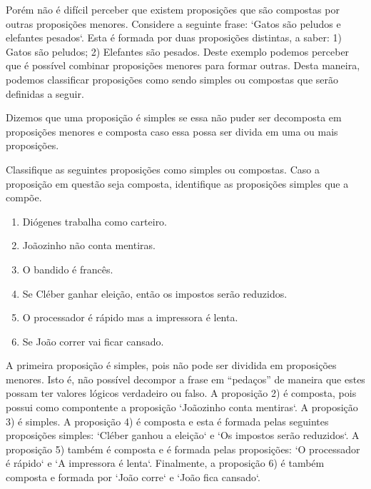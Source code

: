 Por\'em n\~ao \'e dif\'icil perceber que existem proposi\c{c}\~oes que s\~ao compostas por outras proposi\c{c}\~oes menores. Considere a
seguinte frase: `Gatos s\~ao peludos e elefantes pesados`. Esta \'e formada por duas proposi\c{c}\~oes distintas, a saber: 1) Gatos s\~ao peludos; 
2) Elefantes s\~ao pesados. Deste exemplo podemos perceber que \'e poss\'ivel combinar proposi\c{c}\~oes menores para formar outras. Desta maneira,
podemos classificar proposi\c{c}\~oes como sendo simples ou compostas que ser\~ao definidas a seguir.

\begin{Definition}
   Dizemos que uma proposi\c{c}\~ao \'e simples se essa n\~ao puder ser decomposta em proposi\c{c}\~oes menores e composta caso
   essa possa ser divida em uma ou mais proposi\c{c}\~oes. 
\end{Definition}
\begin{Example}
  Classifique as seguintes proposi\c{c}\~oes como simples ou compostas. Caso a proposi\c{c}\~ao em quest\~ao seja composta, identifique
  as proposi\c{c}\~oes simples que a comp\~oe.
  \begin{enumerate}
    \item Di\'ogenes trabalha como carteiro.
    \item Jo\~aozinho n\~ao conta mentiras.
    \item O bandido \'e franc\^es.
    \item Se Cl\'eber ganhar elei\c{c}\~ao, ent\~ao os impostos ser\~ao reduzidos.
    \item O processador \'e r\'apido mas a impressora \'e lenta.
    \item Se Jo\~ao correr vai ficar cansado.
  \end{enumerate}
  A primeira proposi\c{c}\~ao \'e simples, pois n\~ao pode ser dividida em proposi\c{c}\~oes menores. Isto \'e, n\~ao poss\'ivel decompor a frase
  em ``peda\c{c}os'' de maneira que estes possam ter valores l\'ogicos verdadeiro ou falso. A proposi\c{c}\~ao 2) \'e composta, pois possui como
  compontente a proposi\c{c}\~ao `Jo\~aozinho conta mentiras`. A proposi\c{c}\~ao 3) \'e simples. A proposi\c{c}\~ao 4) \'e composta e esta \'e 
  formada pelas seguintes proposi\c{c}\~oes simples: `Cl\'eber ganhou a elei\c{c}\~ao` e `Os impostos ser\~ao reduzidos`. A proposi\c{c}\~ao 5)
  tamb\'em \'e composta e \'e formada pelas proposi\c{c}\~oes: `O processador \'e r\'apido` e `A impressora \'e lenta`. Finalmente, a 
  proposi\c{c}\~ao 6) \'e tamb\'em composta e formada por `Jo\~ao corre` e `Jo\~ao fica cansado`.
\end{Example}

